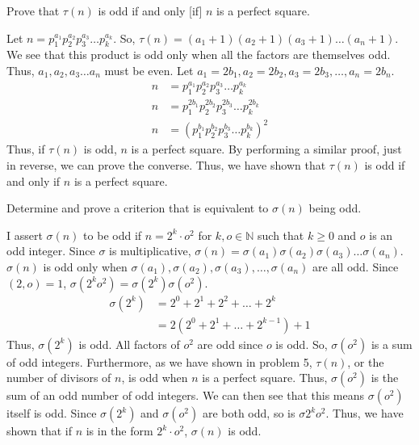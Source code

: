 \documentclass{article}
\begin{document}
\begin{problem}{}{}
    Prove that $\tau(n)$ is odd if and only [if] $n$ is a perfect square.
\end{problem}
\begin{solution}{}{}
    Let $n=p_1^{a_1}p_2^{a_2}p_3^{a_3}\dots p_k^{a_k}$. So, $\tau(n)=(a_1+1)(a_2+1)(a_3+1)\dots(a_n+1)$. We see that this product is odd only when all the factors are themselves odd. Thus, $a_1,a_2,a_3\dots a_n$ must be even. Let $a_1=2b_1,a_2=2b_2,a_3=2b_3,\dots,a_n=2b_n$.
    \begin{align*}
        n&=p_1^{a_1}p_2^{a_2}p_3^{a_3}\dots p_k^{a_k}\\
        n&=p_1^{2b_1}p_2^{2b_2}p_3^{2b_3}\dots p_k^{2b_k}\\
        n&=(p_1^{b_1}p_2^{b_2}p_3^{b_3}\dots p_k^{b_k})^2
    \end{align*}
    Thus, if $\tau(n)$ is odd, $n$ is a perfect square. By performing a similar proof, just in reverse, we can prove the converse. Thus, we have shown that $\tau(n)$ is odd if and only if $n$ is a perfect square.
\end{solution}

\begin{problem}{}{}
    Determine and prove a criterion that is equivalent to $\sigma(n)$ being odd.
\end{problem}
\begin{solution}{}{}
    I assert $\sigma(n)$ to be odd if $n=2^k\cdot o^2$ for $k,o\in\mathbb{N}$ such that $k\geq0$ and $o$ is an odd integer. Since $\sigma$ is multiplicative, $\sigma(n)=\sigma(a_1)\sigma(a_2)\sigma(a_3)\dots\sigma(a_n)$. $\sigma(n)$ is odd only when $\sigma(a_1),\sigma(a_2),\sigma(a_3),\dots,\sigma(a_n)$ are all odd. Since $(2,o)=1$, $\sigma(2^ko^2)=\sigma(2^k)\sigma(o^2)$.
    \begin{align*}
        \sigma(2^k)&=2^0+2^1+2^2+\dots+2^k \\
        &=2(2^0+2^1+\dots+2^{k-1})+1
    \end{align*}
    Thus, $\sigma(2^k)$ is odd. All factors of $o^2$ are odd since $o$ is odd. So, $\sigma(o^2)$ is a sum of odd integers. Furthermore, as we have shown in problem 5, $\tau(n)$, or the number of divisors of $n$, is odd when $n$ is a perfect square. Thus, $\sigma(o^2)$ is the sum of an odd number of odd integers. We can then see that this means $\sigma(o^2)$ itself is odd. Since $\sigma(2^k)$ and $\sigma(o^2)$ are both odd, so is $\sigma{2^ko^2}$. Thus, we have shown that if $n$ is in the form $2^k\cdot o^2$, $\sigma(n)$ is odd.
\end{solution}
\end{document}
